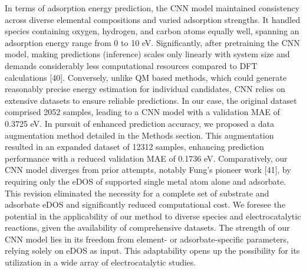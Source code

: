 In terms of adsorption energy prediction, the CNN model maintained consistency across diverse elemental compositions and varied adsorption strengths. It handled species containing oxygen, hydrogen, and carbon atoms equally well, spanning an adsorption energy range from 0 to 10 eV. Significantly, after pretraining the CNN model, making predictions (inference) scales only linearly with system size and demands considerably less computational resources compared to DFT calculations [40]. Conversely, unlike QM based methods, which could generate reasonably precise energy estimation for individual candidates, CNN relies on extensive datasets to ensure reliable predictions. In our case, the original dataset comprised 2052 samples, leading to a CNN model with a validation MAE of 0.3725 eV. In pursuit of enhanced prediction accuracy, we proposed a data augmentation method detailed in the Methods section. This augmentation resulted in an expanded dataset of 12312 samples, enhancing prediction performance with a reduced validation MAE of 0.1736 eV. Comparatively, our CNN model diverges from prior attempts, notably Fung’s pioneer work [41], by requiring only the eDOS of supported single metal atom alone and adsorbate. This revision eliminated the necessity for a complete set of substrate and adsorbate eDOS and significantly reduced computational cost. We foresee the potential in the applicability of our method to diverse species and electrocatalytic reactions, given the availability of comprehensive datasets. The strength of our CNN model lies in its freedom from element- or adsorbate-specific parameters, relying solely on eDOS as input. This adaptability opens up the possibility for its utilization in a wide array of electrocatalytic studies.
